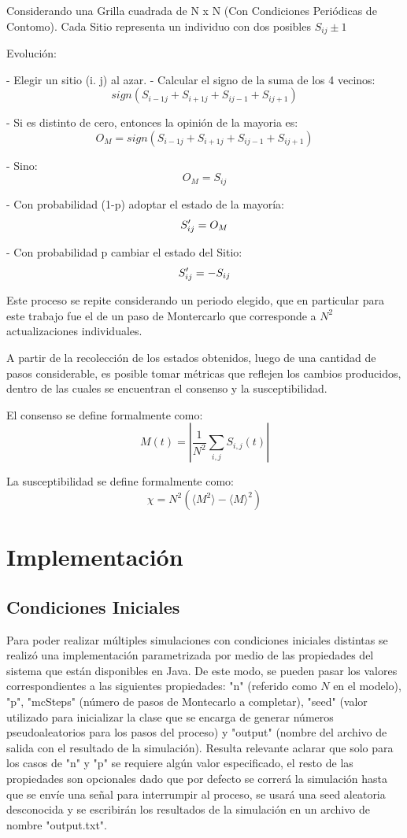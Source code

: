 \documentclass[12pt]{article}
\begin{document}
Considerando una Grilla cuadrada de N x N (Con Condiciones Periódicas de Contomo).
Cada Sitio representa un individuo con dos posibles $S_{ij}\pm1$

Evolución:

- Elegir un sitio (i. j) al azar.
- Calcular el signo de la suma de los 4 vecinos: $$sign(S_{i-1 j}\!+\!S_{i+1j}\!+\!S_{i j-1}\!+\!S_{i j+1})$$

    - Si es distinto de cero, entonces la opinión de la mayoria es:
$$O_{M}=sign(S_{i-1 j}\!+\!S_{i+1j}\!+\!S_{i j-1}\!+\!S_{i j+1})$$

    - Sino:
$$O_{M}=S_{ij}$$

- Con probabilidad (1-p) adoptar el estado de la mayoría: $$S\space^\prime_{ij}=O_{M}$$

- Con probabilidad p cambiar el estado del Sitio: $$S\space^\prime_{ij}=-S_{ij}$$


Este proceso se repite considerando un periodo elegido, que en particular para este trabajo fue el de un paso de Montercarlo que corresponde a $N^{2}$ actualizaciones individuales.

A partir de la recolección de los estados obtenidos, luego de una cantidad de pasos considerable, es posible tomar métricas que reflejen los cambios producidos, dentro de las cuales se encuentran el consenso y la susceptibilidad.

El consenso se define formalmente como:
    $$M(t)=|{\frac{1}{N^{2}}}\sum_{i,j}S_{i,j}(t)|$$

La susceptibilidad se define formalmente como:
    $$\chi=N^{2}\left(\langle M^{2}\rangle-\langle M\rangle^{2}\right)$$

\section{Implementación}
\subsection{Condiciones Iniciales}
Para poder realizar múltiples simulaciones con condiciones iniciales distintas se realizó una implementación parametrizada por medio de las propiedades del sistema que están disponibles en Java. De este modo, se pueden pasar los valores correspondientes a las siguientes propiedades: "n" (referido como $N$ en el modelo), "p", "mcSteps" (número de pasos de Montecarlo a completar), "seed" (valor utilizado para inicializar la clase que se encarga de generar números pseudoaleatorios para los pasos del proceso) y "output" (nombre del archivo de salida con el resultado de la simulación). Resulta relevante aclarar que solo para los casos de "n" y "p" se requiere algún valor especificado, el resto de las propiedades son opcionales dado que por defecto se correrá la simulación hasta que se envíe una señal para interrumpir al proceso, se usará una seed aleatoria desconocida y se escribirán los resultados de la simulación en un archivo de nombre "output.txt".
\end{document}
